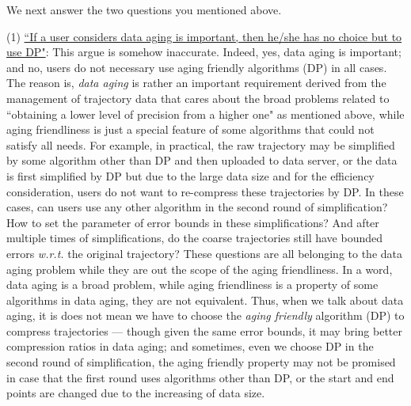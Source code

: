 \documentclass{letter}
\newcommand{\wrt}{\emph{w.r.t.}\xspace}
\begin{document}
{We next answer the two questions you mentioned above.



(1) \underline{``If a user considers data aging is important, then he/she has no choice but to use DP"}: This argue is somehow inaccurate. Indeed, yes, data aging is important; and no, users do not necessary use aging friendly algorithms (DP) in all cases. The reason is,
\emph{data aging} is rather an important requirement derived from the management of trajectory data that cares about the broad problems related to ``obtaining a lower level of precision from a higher one" as mentioned above, while aging friendliness is just a special feature of some algorithms that could not satisfy all needs. For example, in practical, the raw trajectory may be simplified by some algorithm other than DP and then uploaded to data server, or the data is first simplified by DP but due to the large data size and for the efficiency consideration, users do not want to re-compress these trajectories by DP. In these cases, can users use any other algorithm in the second round of simplification? How to set the parameter of error bounds in these simplifications? And after multiple times of simplifications, do the coarse trajectories still have bounded errors \wrt the original trajectory? These questions are all belonging to the data aging problem while they are out the scope of the aging friendliness.
In a word, data aging is a broad problem, while aging friendliness is a property of some algorithms in data aging, they are not equivalent. Thus, when we talk about data aging, it is does not mean we have to choose the \emph{aging friendly} algorithm (DP) to compress trajectories --- though given the same error bounds, it may bring better compression ratios in data aging; and sometimes, even we choose DP in the second round of simplification, the aging friendly property may not be promised in case that the first round uses algorithms other than DP, or the start and end points are changed due to the increasing of data size.

}
\end{document}
